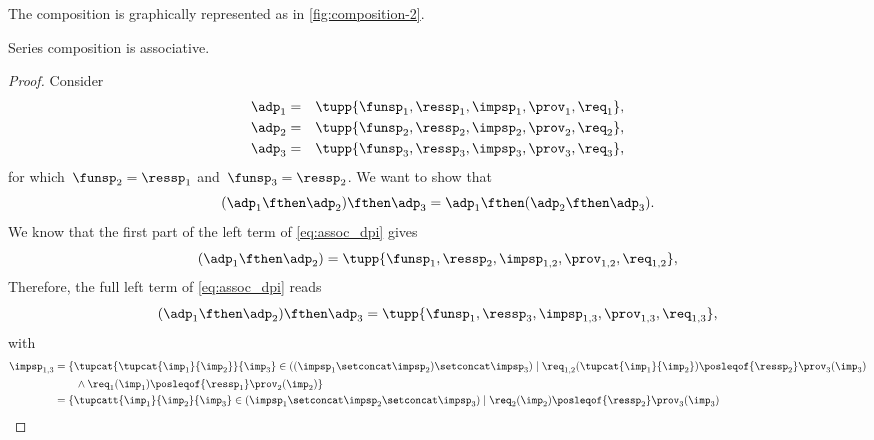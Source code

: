 The composition is graphically represented as in \cref{fig:composition-2}.

\begin{lemma}
	Series composition is associative.
\end{lemma}
\begin{proof}
	Consider
	\begin{equation}
		\begin{aligned}
			\adp_{1} & = & \tupp{\funsp_{1},\ressp_{1},\impsp_{1},\prov_{1},\req_{1}}, \\
			\adp_{2} & = & \tupp{\funsp_{2},\ressp_{2},\impsp_{2},\prov_{2},\req_{2}}, \\
			\adp_{3} & = & \tupp{\funsp_{3},\ressp_{3},\impsp_{3},\prov_{3},\req_{3}},
		\end{aligned}
	\end{equation}
	for which~$\funsp_{2}=\ressp_{1}$ and~$\funsp_{3}=\ressp_{2}$.
	We want to show that
	\begin{equation}
		\label{eq:assoc_dpi}
		(\adp_1\fthen \adp_2)\fthen \adp_3=\adp_1\fthen (\adp_2\fthen \adp_3).
	\end{equation}
	We know that the first part of the left term of \cref{eq:assoc_dpi} gives
	\begin{equation}
		(\adp_{1} \fthen \adp_{2})
		=
		\tupp{ \funsp_{1},\ressp_{2},\impsp_{1,2},\prov_{1,2},\req_{1,2}},
	\end{equation}
	Therefore, the full left term of \cref{eq:assoc_dpi} reads
	\begin{equation}
		\label{eq:dpi_ass_1}
		(\adp_{1} \fthen \adp_{2})\fthen \adp_{3}=\tupp{ \funsp_{1},\ressp_{3},\impsp_{1,3},\prov_{1,3},\req_{1,3}},
	\end{equation}
	with
	\begin{equation}
		\begin{aligned}
			\impsp_{1,3} & =  \{  \tupcat {\tupcat {\imp_{1}} {\imp_{2}}} {\imp_{3}} \in ((\impsp_{1} \setconcat \impsp_{2})\setconcat \impsp_{3})\mid\req_{1,2}(\tupcat {\imp_{1}} {\imp_{2}})\posleqof{\ressp_{2}}\prov_{3}(\imp_{3}) \\
			             & \qquad \wedge \req_{1}(\imp_{1})\posleqof{\ressp_1}\prov_2(\imp_2)\}                                                                                                                                         \\
			             & =\{  \tupcatt{\imp_{1}}{\imp_{2}}{\imp_{3}} \in (\impsp_{1} \setconcat \impsp_{2}\setconcat \impsp_{3})\mid\req_{2}(\imp_2)\posleqof{\ressp_{2}}\prov_{3}(\imp_{3})                                          \\

\end{aligned}
\end{equation}
\end{proof}
